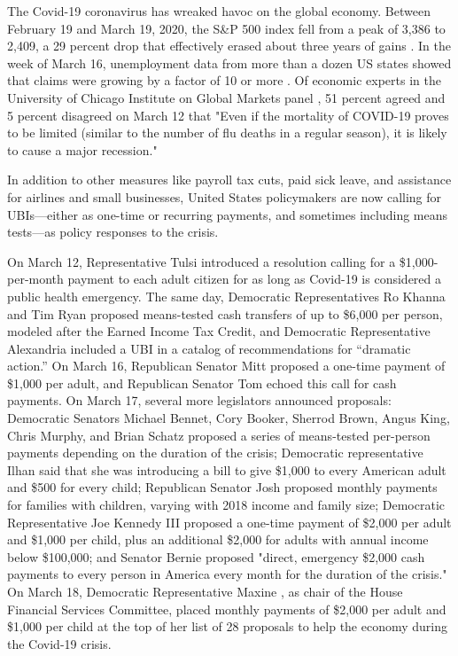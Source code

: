 \documentclass[12pt]{article}
\begin{document}
The Covid-19 coronavirus has wreaked havoc on the global economy. Between February 19 and March 19, 2020, the S\&P 500 index fell from a peak of 3,386 to 2,409, a 29 percent drop that effectively erased about three years of gains \cite{sp500}. In the week of March 16, unemployment data from more than a dozen US states showed that claims were growing by a factor of 10 or more \cite{robbins_2020}. Of economic experts in the University of Chicago Institute on Global Markets panel \citeyear{igm}, 51 percent agreed and 5 percent disagreed on March 12 that "Even if the mortality of COVID-19 proves to be limited (similar to the number of flu deaths in a regular season), it is likely to cause a major recession."

In addition to other measures like payroll tax cuts, paid sick leave, and assistance for airlines and small businesses, United States policymakers are now calling for UBIs---either as one-time or recurring payments, and sometimes including means tests---as policy responses to the crisis.

On March 12, Representative Tulsi  introduced a resolution calling for a \$1,000-per-month payment to each adult citizen for as long as Covid-19 is considered a public health emergency. The same day, Democratic Representatives Ro Khanna and Tim Ryan \citeyear{khanna_ryan} proposed means-tested cash transfers of up to \$6,000 per person, modeled after the Earned Income Tax Credit, and Democratic Representative Alexandria  included a UBI in a catalog of recommendations for “dramatic action.”  On March 16, Republican Senator Mitt  proposed a one-time payment of \$1,000 per adult, and Republican Senator Tom  echoed this call for cash payments. On March 17, several more legislators announced proposals: Democratic Senators Michael Bennet, Cory Booker, Sherrod Brown, Angus King, Chris Murphy, and Brian Schatz \citeyear{bennet} proposed a series of means-tested per-person payments depending on the duration of the crisis; Democratic representative Ilhan  said that she was introducing a bill to give \$1,000 to every American adult and \$500 for every child; Republican Senator Josh  proposed monthly payments for families with children, varying with 2018 income and family size; Democratic Representative Joe Kennedy III \citeyear{iii_2020} proposed a one-time payment of \$2,000 per adult and \$1,000 per child, plus an additional \$2,000 for adults with annual income below \$100,000; and Senator Bernie  proposed "direct, emergency \$2,000 cash payments to every person in America every month for the duration of the crisis." On March 18, Democratic Representative Maxine , as chair of the House Financial Services Committee, placed monthly payments of \$2,000 per adult and \$1,000 per child at the top of her list of 28 proposals to help the economy during the Covid-19 crisis.
\end{document}

